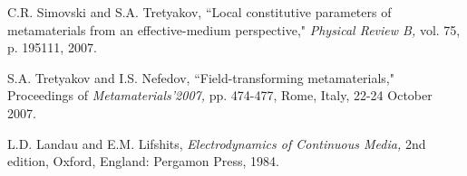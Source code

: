 \documentclass[10pt,a4paper]{article}
\begin{document}
{\small

\begin{thebibliography}{10}
\setlength{\itemsep}{-1ex}


C.R. Simovski and S.A. Tretyakov, ``Local constitutive parameters of metamaterials from an
effective-medium perspective," {\itshape Physical Review B,} vol. 75, p. 195111, 2007.


S.A. Tretyakov and I.S. Nefedov, ``Field-transforming metamaterials," Proceedings of {\itshape Metamaterials'2007,} pp. 474-477, Rome, Italy, 22-24 October 2007.


L.D. Landau and E.M.   Lifshits,  {\itshape Electrodynamics of
Continuous Media,} 2nd edition,  Oxford, England: Pergamon Press,
1984.


\end{thebibliography}

}
\end{document}
